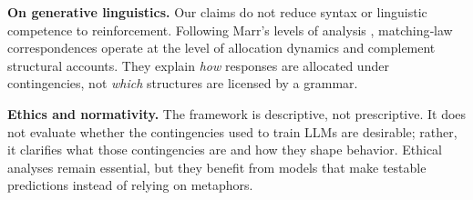 \documentclass[11pt]{article}
\begin{document}







\textbf{On generative linguistics.} Our claims do not reduce syntax or
linguistic competence to reinforcement. Following Marr’s levels of
analysis \citep{marr1982vision}, matching‑law correspondences operate at the level of
allocation dynamics and complement structural accounts. They explain
\emph{how} responses are allocated under contingencies, not
\emph{which} structures are licensed by a grammar.

\textbf{Ethics and normativity.} The framework is descriptive, not
prescriptive. It does not evaluate whether the contingencies used to
train LLMs are desirable; rather, it clarifies what those
contingencies are and how they shape behavior. Ethical analyses remain
essential, but they benefit from models that make testable predictions
instead of relying on metaphors.
\end{document}
